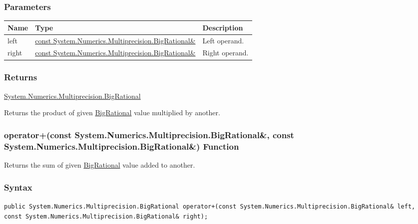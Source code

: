 \documentclass[a4paper,oneside,11.000000pt]{book}
\begin{document}
\subsubsection*{Parameters}
\begin{flushleft}
\begin{supertabular}[l]{!{\raggedright}p{1.30721cm}!{\raggedright}p{8.55945cm}!{\raggedright}p{3.66839cm}}
\textbf{Name}
& \textbf{Type}
& \textbf{Description}
\\
\hline
left
& \hyperlink{System.Numerics.Multiprecision.BigRational}{const System.\-Numerics.\-Multiprecision.\-BigRational\&\-}
& Left operand.

\\
right
& \hyperlink{System.Numerics.Multiprecision.BigRational}{const System.\-Numerics.\-Multiprecision.\-BigRational\&\-}
& Right operand.

\\
\end{supertabular}

\end{flushleft}
\subsubsection*{Returns}
\hyperlink{System.Numerics.Multiprecision.BigRational}{System.\-Numerics.\-Multiprecision.\-BigRational}
\begin{flushleft}
Returns the product of given \hyperlink{System.Numerics.Multiprecision.BigRational}{BigRational} value multiplied by another.

\end{flushleft}
\clearpage

\hypertarget{System.Numerics.Multiprecision.operator.plus.C.R.System.Numerics.Multiprecision.BigRational.C.R.System.Numerics.Multiprecision.BigRational}{\subsubsection*{operator+(const System.Numerics.Multiprecision.BigRational\&, const System.Numerics.Multiprecision.BigRational\&) Function}}
\begin{flushleft}
Returns the sum of given \hyperlink{System.Numerics.Multiprecision.BigRational}{BigRational} value added to another.

\end{flushleft}
\subsubsection*{Syntax}
\texttt{public System.Numerics.Multiprecision.BigRational operator+(const System.Numerics.Multiprecision.BigRational\& left, const System.Numerics.Multiprecision.BigRational\& right);}
\end{document}
